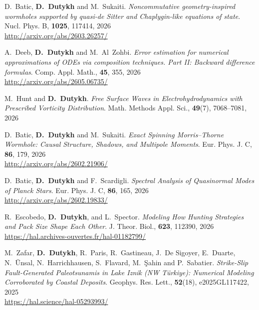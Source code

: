 \documentclass[final, a4paper, oneside, 12pt]{article}
\numberwithin{equation}{section}
\begin{document}
\begin{etaremune}
  \item D.~Batic, \textbf{D.~Dutykh} and M.~Sukaiti. \textit{Noncommutative geometry-inspired wormholes supported by quasi-de Sitter and Chaplygin-like equations of state}. Nucl. Phys. B, \textbf{1025}, 117414, 2026 \\ %
  \url{http://arxiv.org/abs/2603.26257/}

  \item A.~Deeb, \textbf{D.~Dutykh} and M.~Al~Zohbi.  \textit{Error estimation for numerical approximations of ODEs via composition techniques. Part II: Backward difference formulas}. Comp. Appl. Math., \textbf{45}, 355, 2026 \\ %
  \url{http://arxiv.org/abs/2605.06735/}

  \item M.~Hunt and \textbf{D.~Dutykh}. \textit{Free Surface Waves in Electrohydrodynamics with Prescribed Vorticity Distribution}. Math. Methods Appl. Sci., \textbf{49}(7), 7068--7081, 2026 %

  \item D.~Batic, \textbf{D.~Dutykh} and M.~Sukaiti. \textit{Exact Spinning Morris--Thorne Wormhole: Causal Structure, Shadows, and Multipole Moments}. Eur. Phys. J. C, \textbf{86}, 179, 2026 \\ %
  \url{http://arxiv.org/abs/2602.21906/}

  \item D.~Batic, \textbf{D.~Dutykh} and F.~Scardigli. \textit{Spectral Analysis of Quasinormal Modes of Planck Stars}. Eur. Phys. J. C, \textbf{86}, 165, 2026 \\ %
  \url{http://arxiv.org/abs/2602.19833/}

  \item R.~Escobedo, \textbf{D.~Dutykh}, and L.~Spector. \textit{Modeling How Hunting Strategies and Pack Size Shape Each Other}. J. Theor. Biol., \textbf{623}, 112390, 2026 \\ %
  \url{https://hal.archives-ouvertes.fr/hal-01182799/}

  
  
  \item M.~Zafar, \textbf{D.~Dutykh}, R.~Paris, R.~Gastineau, J.~De Sigoyer, E.~Duarte, N.~\"Unsal, N.~Harrichhausen, S.~Flavard, M.~\c{S}ahin and P.~Sabatier. \textit{Strike-Slip Fault-Generated Paleotsunamis in Lake Iznik (NW T\"{u}rkiye): Numerical Modeling Corroborated by Coastal Deposits}. Geophys. Res. Lett., \textbf{52}(18), e2025GL117422, 2025 \\ %
  \url{https://hal.science/hal-05293993/}
  

\end{etaremune}
\end{document}
